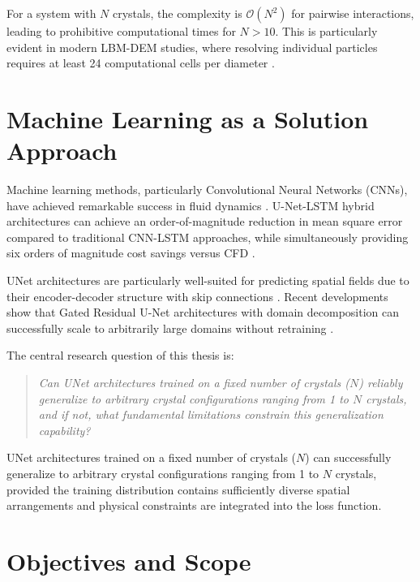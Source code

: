 For a system with $N$ crystals, the complexity is $\mathcal{O}(N^2)$ for pairwise interactions, leading to prohibitive computational times for $N > 10$. This is particularly evident in modern LBM-DEM studies, where resolving individual particles requires at least 24 computational cells per diameter \parencite{zeng2014coupled}.

\section{Machine Learning as a Solution Approach}

Machine learning methods, particularly Convolutional Neural Networks (CNNs), have achieved remarkable success in fluid dynamics \parencite{thuerey2020deep}. U-Net-LSTM hybrid architectures can achieve an order-of-magnitude reduction in mean square error compared to traditional CNN-LSTM approaches, while simultaneously providing six orders of magnitude cost savings versus CFD \parencite{hou2022unet_lstm}.

UNet architectures are particularly well-suited for predicting spatial fields due to their encoder-decoder structure with skip connections \parencite{ronneberger2015unet}. Recent developments show that Gated Residual U-Net architectures with domain decomposition can successfully scale to arbitrarily large domains without retraining \parencite{rana2024scalable_cnn}.

The central research question of this thesis is:

\begin{quote}
\textit{Can UNet architectures trained on a fixed number of crystals ($N$) reliably generalize to arbitrary crystal configurations ranging from 1 to $N$ crystals, and if not, what fundamental limitations constrain this generalization capability?}
\end{quote}

\begin{hypothesis}
\label{hyp:generalization}
UNet architectures trained on a fixed number of crystals ($N$) can successfully generalize to arbitrary crystal configurations ranging from 1 to $N$ crystals, provided the training distribution contains sufficiently diverse spatial arrangements and physical constraints are integrated into the loss function.
\end{hypothesis}

\section{Objectives and Scope}

